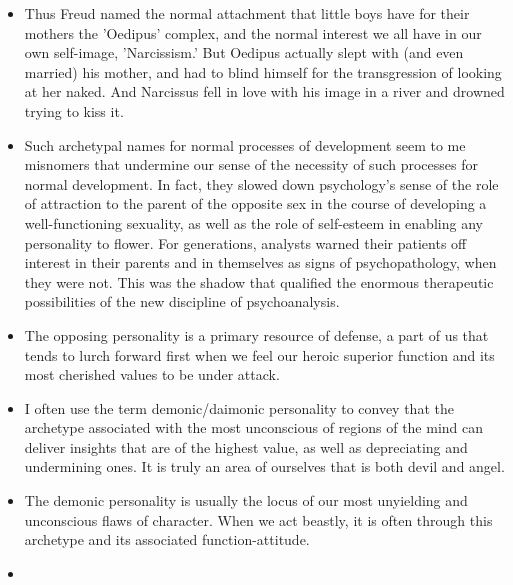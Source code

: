 \begin{itemize}
When there is development of both the superior and the inferior functions, we
can speak of a 'spine' of consciousness that gives a personality backbone.

\item

Thus Freud named the normal attachment that little boys have for their mothers
the 'Oedipus' complex, and the normal interest we all have in our own
self-image, 'Narcissism.' But Oedipus actually slept with (and even married)
his mother, and had to blind himself for the transgression of looking at her
naked. And Narcissus fell in love with his image in a river and drowned trying
to kiss it.

\item

Such archetypal names for normal processes of development seem to me misnomers
that undermine our sense of the necessity of such processes for normal
development. In fact, they slowed down psychology's sense of the role of
attraction to the parent of the opposite sex in the course of developing a
well-functioning sexuality, as well as the role of self-esteem in enabling any
personality to flower. For generations, analysts warned their patients off
interest in their parents and in themselves as signs of psychopathology, when
they were not. This was the shadow that qualified the enormous therapeutic
possibilities of the new discipline of psychoanalysis.

\item

The opposing personality is a primary resource of defense, a part of us that
tends to lurch forward first when we feel our heroic superior function and its
most cherished values to be under attack.

\item

I often use the term demonic/daimonic personality to convey that the archetype
associated with the most unconscious of regions of the mind can deliver
insights that are of the highest value, as well as depreciating and undermining
ones. It is truly an area of ourselves that is both devil and angel.

\item

The demonic personality is usually the locus of our most unyielding and
unconscious flaws of character. When we act beastly, it is often through this
archetype and its associated function-attitude.

\item


\end{itemize}
